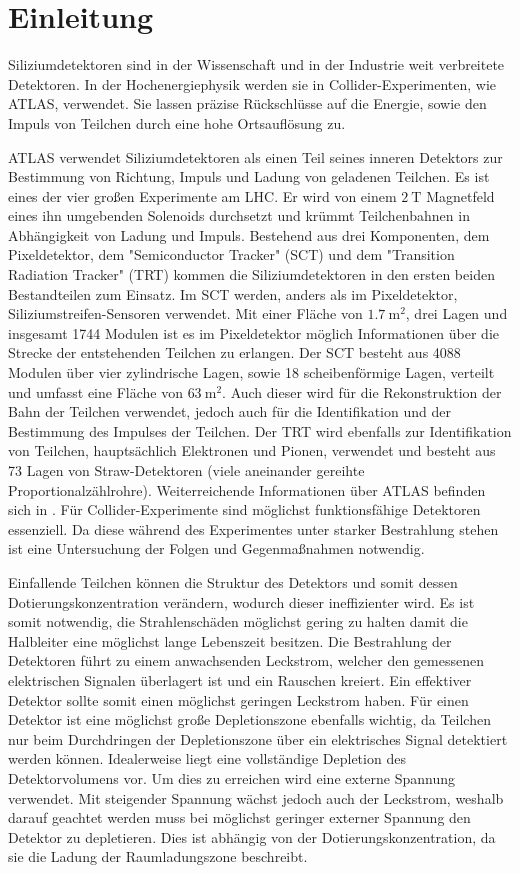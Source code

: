 \chapter{Einleitung}
Siliziumdetektoren sind in der Wissenschaft und in der Industrie weit verbreitete
Detektoren. In der Hochenergiephysik werden sie in Collider-Experimenten, wie ATLAS, verwendet.
Sie  lassen präzise Rückschlüsse auf die Energie, sowie den Impuls von Teilchen durch eine
hohe Ortsauflösung zu.


ATLAS verwendet Siliziumdetektoren als
einen Teil seines inneren Detektors zur Bestimmung von Richtung, Impuls
und Ladung von geladenen Teilchen. Es ist eines der vier großen Experimente am LHC.
Er wird von einem $\SI{2}{\tesla}$ Magnetfeld eines ihn umgebenden Solenoids
durchsetzt und krümmt Teilchenbahnen in Abhängigkeit von Ladung und Impuls.
Bestehend aus drei Komponenten, dem Pixeldetektor, dem "Semiconductor Tracker" (SCT) und dem "Transition Radiation Tracker" (TRT) kommen  die
Siliziumdetektoren in den ersten beiden Bestandteilen zum Einsatz. Im SCT werden, anders als im Pixeldetektor, Siliziumstreifen-Sensoren verwendet.
Mit einer Fläche von $\SI{1.7}{\meter\squared}$, drei Lagen und insgesamt 1744 Modulen ist es im Pixeldetektor möglich
Informationen über die Strecke der entstehenden Teilchen zu erlangen. Der SCT besteht aus 4088 Modulen über vier zylindrische Lagen,
sowie 18 scheibenförmige Lagen, verteilt und umfasst eine Fläche von $\SI{63}{\meter\squared}$. Auch dieser wird für
die Rekonstruktion der Bahn der Teilchen verwendet, jedoch auch für die Identifikation und der Bestimmung des Impulses der Teilchen.
Der TRT wird ebenfalls zur Identifikation von Teilchen, hauptsächlich Elektronen und Pionen, verwendet und besteht aus 73 Lagen
von Straw-Detektoren (viele aneinander gereihte Proportionalzählrohre).
Weiterreichende Informationen über ATLAS befinden sich in \cite{ATLAS}.
Für Collider-Experimente sind möglichst funktionsfähige Detektoren essenziell. Da diese während des Experimentes unter starker Bestrahlung
stehen ist eine Untersuchung der Folgen und Gegenmaßnahmen notwendig.


Einfallende Teilchen können die
Struktur des Detektors und somit dessen Dotierungskonzentration verändern, wodurch dieser ineffizienter wird.
Es ist somit notwendig, die Strahlenschäden möglichst gering zu halten damit
die Halbleiter eine möglichst lange Lebenszeit besitzen.
Die Bestrahlung der Detektoren führt zu einem anwachsenden Leckstrom, welcher den
gemessenen elektrischen Signalen überlagert ist und ein Rauschen kreiert. Ein
effektiver Detektor sollte somit einen möglichst geringen Leckstrom haben.
Für einen Detektor ist eine möglichst große Depletionszone ebenfalls wichtig,
da Teilchen nur beim Durchdringen der Depletionszone über ein elektrisches Signal detektiert
werden können.
Idealerweise
liegt eine vollständige Depletion des Detektorvolumens vor. Um dies zu erreichen wird
eine externe Spannung verwendet. Mit steigender Spannung wächst jedoch auch der Leckstrom, weshalb
darauf geachtet werden muss bei möglichst geringer externer Spannung den Detektor zu depletieren.
Dies ist abhängig von der Dotierungskonzentration, da sie die Ladung der
Raumladungszone beschreibt.

